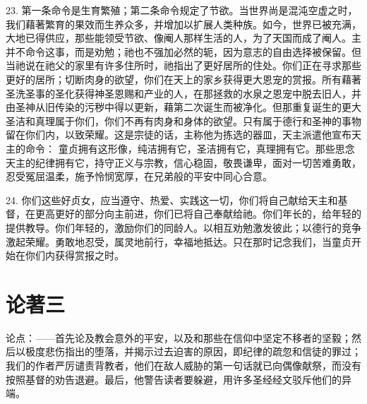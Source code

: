 23. 第一条命令是生育繁殖；第二条命令规定了节欲。当世界尚是混沌空虚之时，我们藉著繁育的果效而生养众多，并增加以扩展人类种族。如今，世界已被充满，大地已得供应，那些能领受节欲、像阉人那样生活的人，为了天国而成了阉人。主并不命令这事，而是劝勉；祂也不强加必然的轭，因为意志的自由选择被保留。但当祂说在祂父的家里有许多住所时，祂指出了更好居所的住处。你们正在寻求那些更好的居所；切断肉身的欲望，你们在天上的家乡获得更大恩宠的赏报。所有藉著圣洗圣事的圣化获得神圣恩赐和产业的人，在那拯救的水泉之恩宠中脱去旧人，并由圣神从旧传染的污秽中得以更新，藉第二次诞生而被净化。但那重复诞生的更大圣洁和真理属于你们，你们不再有肉身和身体的欲望。只有属于德行和圣神的事物留在你们内，以致荣耀。这是宗徒的话，主称他为拣选的器皿，天主派遣他宣布天主的命令：  童贞拥有这形像，纯洁拥有它，圣洁拥有它，真理拥有它。那些思念天主的纪律拥有它，持守正义与宗教，信心稳固，敬畏谦卑，面对一切苦难勇敢，忍受冤屈温柔，施予怜悯宽厚，在兄弟般的平安中同心合意。\par

24. 你们这些好贞女，应当遵守、热爱、实践这一切，你们将自己献给天主和基督，在更高更好的部分向主前进，你们已将自己奉献给祂。你们年长的，给年轻的提供教导。你们年轻的，激励你们的同龄人。以相互劝勉激发彼此；以德行的竞争激起荣耀。勇敢地忍受，属灵地前行，幸福地抵达。只在那时记念我们，当童贞开始在你们内获得赏报之时。\par



\section{论著三}

\par

论点：——首先论及教会意外的平安，以及和那些在信仰中坚定不移者的坚毅；然后以极度悲伤指出的堕落，并揭示过去迫害的原因，即纪律的疏忽和信徒的罪过；我们的作者严厉谴责背教者，他们在敌人威胁的第一句话就已向偶像献祭，而没有按照基督的劝告退避。最后，他警告读者要躲避，用许多圣经经文驳斥他们的异端。\par

